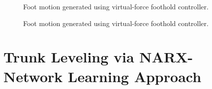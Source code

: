			\begin{figure}[h!]
				\centering
				\caption{Foot motion generated using virtual-force foothold controller.}
				\label{fig::body_motion}
			\end{figure}
			\begin{figure}[h!]
				\centering
				\caption{Foot motion generated using virtual-force foothold controller.}
				\label{fig::body_motion}
			\end{figure}




	\section{Trunk Leveling via NARX-Network Learning Approach}

